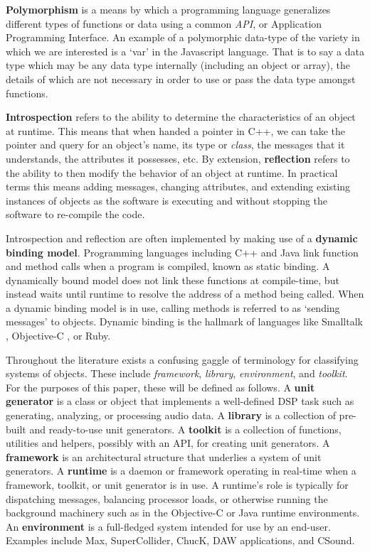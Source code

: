 \documentclass[twoside,10pt]{article}
\begin{document}
\textbf{Polymorphism} is a means by which a programming language generalizes different types of functions or data using a common \emph{API}, or Application Programming Interface.  An example of a polymorphic data-type of the variety in which we are interested is a `var' in the Javascript language\cite{Flanagan:2002}.  That is to say a data type which may be any data type internally (including an object or array), the details of which are not necessary in order to use or pass the data type amongst functions.

\textbf{Introspection} refers to the ability to determine the characteristics of an object at runtime.  This means that when handed a pointer in C++, we can take the pointer and query for an object's name, its type or \emph{class}, the messages that it understands, the attributes it possesses, etc.  By extension, \textbf{reflection} refers to the ability to then modify the behavior of an object at runtime\cite{Malenfant:1996}.  In practical terms this means adding messages, changing attributes, and extending existing instances of objects as the software is executing and without stopping the software to re-compile the code.

Introspection and reflection are often implemented by making use of a \textbf{dynamic binding model}.  Programming languages including C++ and Java link function and method calls when a program is compiled, known as static binding.  A dynamically bound model does not link these functions at compile-time, but instead waits until runtime to resolve the address of a method being called.  When a dynamic binding model is in use, calling methods is referred to as `sending messages' to objects. Dynamic binding is the hallmark of languages like Smalltalk \cite{Krasner:1988}, Objective-C \cite{Cox:1986}, or Ruby.

Throughout the literature exists a confusing gaggle of terminology for classifying systems of objects.  These include \emph{framework}, \emph{library}, \emph{environment}, and \emph{toolkit}.  For the purposes of this paper, these will be defined as follows.  
A \textbf{unit generator} is a class or object that implements a well-defined DSP task such as generating, analyzing, or processing audio data.
A \textbf{library} is a collection of pre-built and ready-to-use unit generators.
A \textbf{toolkit} is a collection of functions, utilities and helpers, possibly with an API, for creating unit generators.
A \textbf{framework} is an architectural structure that underlies a system of unit generators.
A \textbf{runtime} is a daemon or framework operating in real-time when a framework, toolkit, or unit generator is in use. A runtime's role is typically for dispatching messages, balancing processor loads, or otherwise running the background machinery such as in the Objective-C or Java runtime environments.
An \textbf{environment} is a full-fledged system intended for use by an end-user.  Examples include Max, SuperCollider, ChucK, DAW applications, and CSound.
\end{document}
